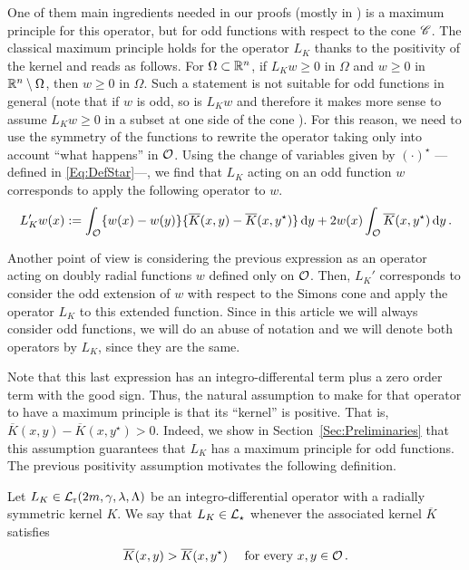 One of them main ingredients needed in our proofs (mostly in \cite{FelipeSanz-Perela:IntegroDifferentialII}) is a maximum principle for this operator, but for odd functions with respect to the cone $\mathscr{C}$. The classical maximum principle holds for the operator $L_K$ thanks to the positivity of the kernel and reads as follows. For $\Omega \subset \mathbb{R}^n$, if $L_K w \geq 0$ in $\Omega$ and $w \geq 0$ in $\mathbb{R}^n \setminus \Omega$, then $w\geq 0$ in $\Omega$. Such a statement is not suitable for odd functions in general (note that if $w$ is odd, so is $L_K w$ and therefore it makes more sense to assume $L_K w \geq 0$ in a subset  at one side of the cone ). For this reason, we need to use the symmetry of the functions to rewrite the operator taking only into account ``what happens'' in $\mathcal{O}$. Using the change of variables given by $(\cdot)^\star$ ---defined in \eqref{Eq:DefStar}---, we find that $L_K$ acting on an odd function $w$ corresponds to apply the following operator to $w$. 
\begin{equation}
	L_K' w (x) := \int_{\mathcal{O}} \{w(x) - w(y) \} \{\overline{K}(x, y) - \overline{K}(x, y^\star)  \} \,\mathrm{d} y +  2 w(x) \int_{\mathcal{O}} \overline{K}(x, y^\star) \,\mathrm{d} y \,.
\end{equation}


Another point of view is considering the previous expression as an operator acting on doubly radial functions $w$ defined only on $\mathcal{O}$. Then, $L_K'$ corresponds to consider the odd extension of  $w$ with respect to the Simons cone and apply the operator $L_K$ to this extended function. Since in this article we will always consider odd functions, we will do an abuse of notation and we will denote both operators by $L_K$, since they are the same.

Note that this last expression has an integro-differental term plus a zero order term with the good sign. Thus, the natural assumption to make for that operator to have a maximum principle is that its ``kernel'' is positive. That is, $\overline{K}(x, y) - \overline{K}(x, y^\star)>0$. Indeed, we show in Section~\ref{Sec:Preliminaries} that this assumption guarantees that $L_K$ has a maximum principle for odd functions. The previous positivity assumption motivates the following definition.

\begin{definition}
	Let $L_K \in \mathcal{L}_{\mathrm{r}}(2m,\gamma,\lambda, \Lambda)$ be an integro-differential operator with a radially symmetric kernel $K$. We say that $L_K\in \mathcal{L}_\star$ whenever the associated kernel $\overline{K}$ satisfies
	\begin{equation}
		\label{Eq:KernelInequality}
		\overline{K}(x,y) > \overline{K}(x, y^\star) \quad \text{ for every }x,y \in \mathcal{O}\,.
	\end{equation}
\end{definition}

